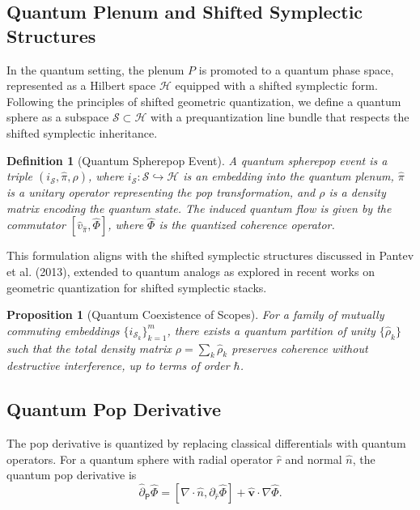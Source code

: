 \documentclass[12pt]{article}
\newtheorem{definition}{Definition}
\newtheorem{proposition}{Proposition}
\begin{document}
\subsection{Quantum Plenum and Shifted Symplectic Structures}
In the quantum setting, the plenum \(P\) is promoted to a quantum phase space, represented as a Hilbert space \(\mathcal{H}\) equipped with a shifted symplectic form. Following the principles of shifted geometric quantization, we define a quantum sphere as a subspace \(\mathcal{S} \subset \mathcal{H}\) with a prequantization line bundle that respects the shifted symplectic inheritance.

\begin{definition}[Quantum Spherepop Event]
A quantum spherepop event is a triple \((i_{\mathcal{S}}, \hat{\pi}, \rho)\), where \(i_{\mathcal{S}}: \mathcal{S} \hookrightarrow \mathcal{H}\) is an embedding into the quantum plenum, \(\hat{\pi}\) is a unitary operator representing the pop transformation, and \(\rho\) is a density matrix encoding the quantum state. The induced quantum flow is given by the commutator \([\hat{v}_{\hat{\pi}}, \hat{\Phi}]\), where \(\hat{\Phi}\) is the quantized coherence operator.
\end{definition}

This formulation aligns with the shifted symplectic structures discussed in Pantev et al. (2013), extended to quantum analogs as explored in recent works on geometric quantization for shifted symplectic stacks.

\begin{proposition}[Quantum Coexistence of Scopes]
For a family of mutually commuting embeddings \(\{i_{\mathcal{S}_k}\}_{k=1}^m\), there exists a quantum partition of unity \(\{\hat{\rho}_k\}\) such that the total density matrix \(\rho = \sum_k \hat{\rho}_k\) preserves coherence without destructive interference, up to terms of order \(\hbar\).
\end{proposition}

\subsection{Quantum Pop Derivative}
The pop derivative is quantized by replacing classical differentials with quantum operators. For a quantum sphere with radial operator \(\hat{r}\) and normal \(\hat{n}\), the quantum pop derivative is
\begin{equation}
\hat{\partial}_{\mathsf{P}} \hat{\Phi} = [\nabla \cdot \hat{n}, \partial_{\hat{r}} \hat{\Phi}] + \hat{\mathbf{v}} \cdot \nabla \hat{\Phi}.
\end{equation}
\end{document}
